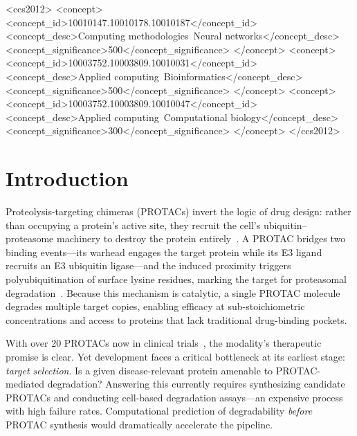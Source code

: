 \documentclass[sigconf]{acmart}
\begin{document}
\begin{CCSXML}
<ccs2012>
<concept>
<concept_id>10010147.10010178.10010187</concept_id>
<concept_desc>Computing methodologies~Neural networks</concept_desc>
<concept_significance>500</concept_significance>
</concept>
<concept>
<concept_id>10003752.10003809.10010031</concept_id>
<concept_desc>Applied computing~Bioinformatics</concept_desc>
<concept_significance>500</concept_significance>
</concept>
<concept>
<concept_id>10003752.10003809.10010047</concept_id>
<concept_desc>Applied computing~Computational biology</concept_desc>
<concept_significance>300</concept_significance>
</concept>
</ccs2012>
\end{CCSXML}



\maketitle


\section{Introduction}

Proteolysis-targeting chimeras (PROTACs) invert the logic of drug design: rather than occupying a protein's active site, they recruit the cell's ubiquitin--proteasome machinery to destroy the protein entirely~\cite{bekes2022protac,sakamoto2001protacs,pettersson2019pbd}.
A PROTAC bridges two binding events---its warhead engages the target protein while its E3 ligand recruits an E3 ubiquitin ligase---and the induced proximity triggers polyubiquitination of surface lysine residues, marking the target for proteasomal degradation~\cite{lai2017induced}.
Because this mechanism is catalytic, a single PROTAC molecule degrades multiple target copies, enabling efficacy at sub-stoichiometric concentrations and access to proteins that lack traditional drug-binding pockets.

With over 20 PROTACs now in clinical trials~\cite{bekes2022protac}, the modality's therapeutic promise is clear.
Yet development faces a critical bottleneck at its earliest stage: \emph{target selection}.
Is a given disease-relevant protein amenable to PROTAC-mediated degradation?
Answering this currently requires synthesizing candidate PROTACs and conducting cell-based degradation assays---an expensive process with high failure rates.
Computational prediction of degradability \emph{before} PROTAC synthesis would dramatically accelerate the pipeline.
\end{document}
